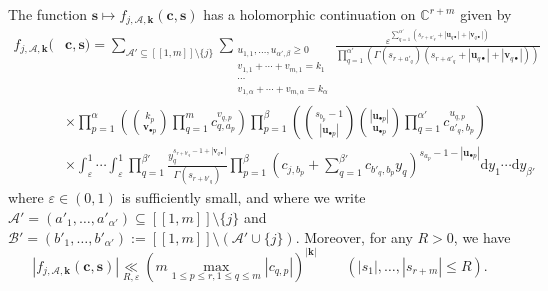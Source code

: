 \documentclass[10pt,a4paper]{amsart}
\newcommand{\dd}{\mathrm{d}}
\begin{document}
\begin{proposition}
\label{prop:expression_f_Ajepsilon_s}
The function $\mathbf{s} \mapsto f_{j,\mathcal{A},\mathbf{k}}(\mathbf{c},\mathbf{s})$ has a holomorphic continuation on $\mathbb{C}^{r+m}$ given by
\begin{align}
    f_{j,\mathcal{A},\mathbf{k}}(&\mathbf{c},\mathbf{s}) = \sum_{\mathcal{A}' \subseteq [\![ 1,m ]\!] \setminus \{ j \}} \sum_{\substack{ u_{1,1},\ldots,u_{\alpha',\beta} \geq 0 \\ v_{1,1}+\cdots+v_{m,1}=k_1 \\ \cdots \\ v_{1,\alpha}+\cdots+v_{m,\alpha}=k_{\alpha}}} \frac{\varepsilon^{ \sum_{q=1}^{\alpha'} \left(s_{r+a'_q}+|\mathbf{u}_{q \bullet}| + |\mathbf{v}_{q \bullet}|\right)}}{\prod_{q=1}^{\alpha'} \left( \Gamma(s_{r+a'_q})(s_{r+a'_q}+ |\mathbf{u}_{q \bullet}| + |\mathbf{v}_{q \bullet}|)\right)} \nonumber \\
    & \times \prod_{p=1}^{\alpha} \left(\binom{k_p}{\mathbf{v}_{\bullet p}} \prod_{q=1}^m c_{q,a_p}^{v_{q,p}} \right) \prod_{p=1}^{\beta} \left( \binom{s_{b_p}-1}{|\mathbf{u}_{\bullet p}|} \binom{|\mathbf{u}_{\bullet p}|}{\mathbf{u}_{\bullet p}} \prod_{q=1}^{\alpha'} c_{a'_q,b_p}^{u_{q,p}} \right) \label{eq:expression_f_Ajepsilon_s} \\
    & \times \int_{\varepsilon}^{1} \cdots \int_{\varepsilon}^1 \prod_{q=1}^{\beta'} \frac{y_q^{s_{r+b'_q}-1+|\mathbf{v}_{q \bullet}|}}{\Gamma(s_{r+b'_q})} \prod_{p=1}^{\beta} \left( c_{j,b_p}+\sum_{q=1}^{\beta'} c_{b'_q,b_p} y_{q} \right)^{s_{a_p}-1-|\mathbf{u}_{\bullet p}|} \dd y_1 \cdots \dd y_{\beta'} \nonumber
\end{align}
where $\varepsilon \in (0,1)$ is sufficiently small, and where we write $\mathcal{A}'=(a'_1,\ldots,a'_{\alpha'}) \subseteq [\![ 1,m ]\!] \setminus \{ j \}$ and $\mathcal{B}'=(b'_1,\ldots,b'_{\alpha'}) := [\![ 1,m ]\!] \setminus ( \mathcal{A}' \cup \{ j \})$. Moreover, for any $R>0$, we have
\begin{equation}
    |f_{j,\mathcal{A},\mathbf{k}}(\mathbf{c},\mathbf{s})| \underset{R,\varepsilon}{\ll} (m \max_{1 \leq p \leq r, 1 \leq q \leq m}|c_{q,p}|)^{|\mathbf{k}|} \qquad (|s_1|,\ldots,|s_{r+m}| \leq R). \label{eq:bound_f_Ajk}
\end{equation}
\end{proposition}
\end{document}
